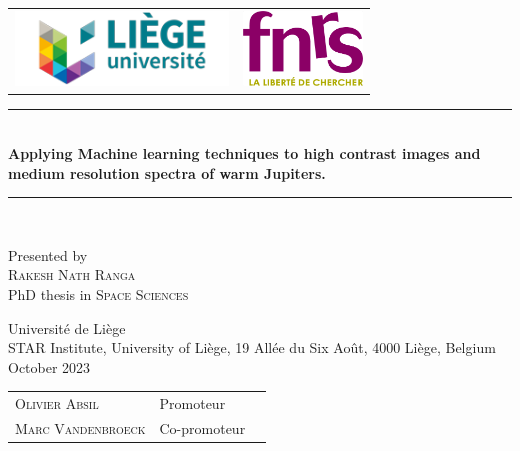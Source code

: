 \documentclass[12pt,chapterprefix=True]{book}
\newcommand{\HRule}{\rule{\linewidth}{0.7mm}}
\newcommand{\Hrule}{\rule{\linewidth}{0.3mm}}
\begin{document}
	
	\begin{titlepage}
		\begin{center}
			\begin{tabular}{c@{\hskip 3cm}c}
				\includegraphics[height=2cm]{images/uliege logo.png} &
				\includegraphics[height=2cm]{images/FRS-FNRS_ros_vert_transp.png}\\
			\end{tabular}
		\end{center}
  \vspace{1cm}
  \begin{center}
	 		\HRule \\[0.2cm]
	 		 { \Large \bfseries Applying Machine learning techniques to high contrast images and medium resolution spectra of warm Jupiters.}
	  		\Hrule \\
		\end{center}
\vspace{1cm}
		\begin{center}
			Presented by \\[0.5cm] 
   \textsc{\Large Rakesh Nath Ranga}\\[0.1cm]
			PhD thesis in \textsc{\large Space Sciences}\\%
		\end{center}
     \vspace{1cm}
		\begin{center}
			Université de Li\`ege\\
			STAR Institute, University of Liège, 19 Allée du Six Août, 4000 Liège, Belgium\\
			\vspace{0.5cm}
			October 2023
		\end{center}
		\vspace{1cm}
		\begin{center}
			\begin{tabular}{lll}
				\textsc{Olivier Absil}  &  Promoteur\\
				\textsc{Marc Vandenbroeck}  &  Co-promoteur \\
			\end{tabular}\\%
		\end{center}
	\end{titlepage}
	\newpage
\end{document}
